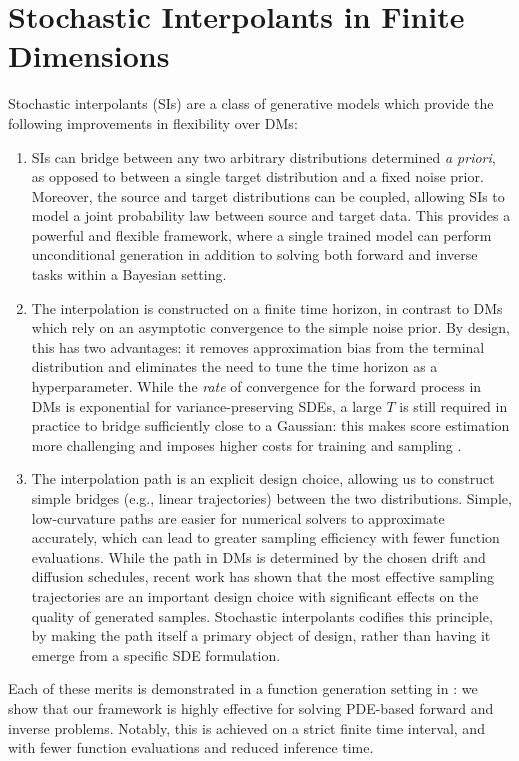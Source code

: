 \section{Stochastic Interpolants in Finite Dimensions}
Stochastic interpolants (SIs) are a class of generative models which provide the following improvements in flexibility over DMs:
\begin{enumerate}
  \item SIs can bridge between any two arbitrary distributions determined \textit{a priori}, as opposed to between a single target distribution and a fixed noise prior. Moreover, the source and target distributions can be coupled, allowing SIs to model a joint probability law between source and target data. This provides a powerful and flexible framework, where a single trained model can perform unconditional generation in addition to solving both forward and inverse tasks within a Bayesian setting.
  \item The interpolation is constructed on a finite time horizon, in contrast to DMs which rely on an asymptotic convergence to the simple noise prior.  By design, this has two advantages: it removes approximation bias from the terminal distribution and eliminates the need to tune the time horizon as a hyperparameter. While the \textit{rate} of convergence for the forward process in DMs is exponential for variance-preserving SDEs, a large \(T\) is still required in practice to bridge sufficiently close to a Gaussian: this makes score estimation more challenging and imposes higher costs for training and sampling \citep{franzese2023much}.
  \item The interpolation path is an explicit design choice, allowing us to construct simple bridges (e.g., linear trajectories) between the two distributions. Simple, low-curvature paths are easier for numerical solvers to approximate accurately, which can lead to greater sampling efficiency with fewer function evaluations. While the path in DMs is determined by the chosen drift and diffusion schedules, recent work \citep{karras2022elucidating,williams2024score} has shown that the most effective sampling trajectories are an important design choice with significant effects on the quality of generated samples. Stochastic interpolants codifies this principle, by making the path itself a primary object of design, rather than having it emerge from a specific SDE formulation.
\end{enumerate}

Each of these merits is demonstrated in a function generation setting in : we show that our framework is highly effective for solving PDE-based forward and inverse problems. Notably, this is achieved on a strict finite time interval, and with fewer function evaluations and reduced inference time.

